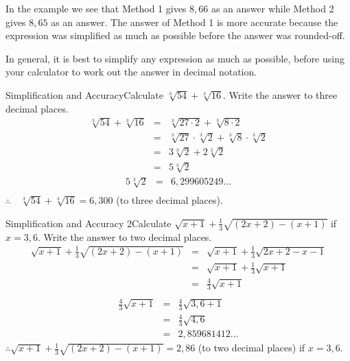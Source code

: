 In the example we see that Method 1 gives $8,66$ as an answer while Method 2 gives $8,65$ as an answer. The answer of Method 1 is more accurate because the expression was simplified as much as possible before the answer was rounded-off.

In general, it is best to simplify any expression as much as possible, before using your calculator to work out the answer in decimal notation.


\begin{wex}{Simplification and Accuracy}{Calculate $\sqrt[3]{54}+\sqrt[3]{16}$. Write the answer to three decimal places.}{
\begin{eqnarray*}
\sqrt[3]{54}+\sqrt[3]{16}&=&\sqrt[3]{27 \cdot 2}+\sqrt[3]{8 \cdot 2}\\
&=&\sqrt[3]{27} \cdot \sqrt[3]{2}+\sqrt[3]{8} \cdot \sqrt[3]{2}\\
&=&3 \sqrt[3]{2}+2 \sqrt[3]{2}\\
&=&5 \sqrt[3]{2}
\end{eqnarray*}
\begin{eqnarray*}
5 \sqrt[3]{2}&=&6,299605249\ldots\\
\end{eqnarray*}
$\therefore \quad \sqrt[3]{54}+\sqrt[3]{16}=6,300$ (to three decimal places).}
\end{wex}

\begin{wex}{Simplification and Accuracy 2}{Calculate $\sqrt{x+1}+\frac{1}{3}\sqrt{(2x+2)-(x+1)}$ if $x=3,6$. Write the answer to two decimal places.}{
\begin{eqnarray*}
\sqrt{x+1}+\frac{1}{3}\sqrt{(2x+2)-(x+1)}&=&\sqrt{x+1}+\frac{1}{3}\sqrt{2x+2-x-1}\\
&=&\sqrt{x+1}+\frac{1}{3}\sqrt{x+1}\\
&=&\frac{4}{3}\sqrt{x+1}\\
\end{eqnarray*}
\begin{eqnarray*}
\frac{4}{3}\sqrt{x+1}&=&\frac{4}{3}\sqrt{3,6+1}\\
&=&\frac{4}{3}\sqrt{4,6}\\
&=&2,859681412 \ldots
\end{eqnarray*}
$\therefore \sqrt{x+1}+\frac{1}{3}\sqrt{(2x+2)-(x+1)}=2,86$ (to two decimal places) if $x=3,6$.}
\end{wex}

